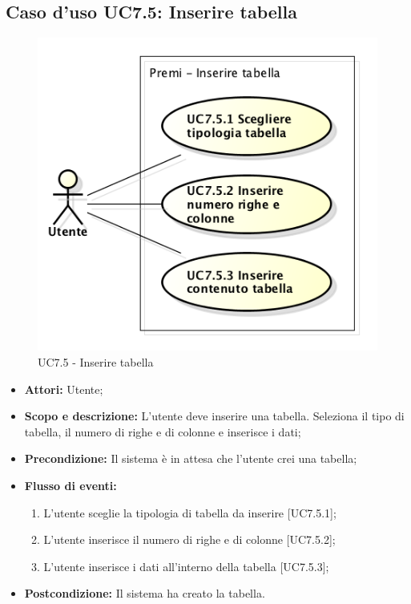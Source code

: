 \subsection{Caso d'uso UC7.5: Inserire tabella}
\begin{figure}[h] 
	\centering 
	\includegraphics[scale=0.45] {img/UC7.5.png} 
	\caption{UC7.5 - Inserire tabella} 
\end{figure}

\begin{itemize}
	\item \textbf{Attori:} Utente;
	\item \textbf{Scopo e descrizione:} L'utente deve inserire una tabella. Seleziona il tipo di tabella, il numero di righe e di colonne e inserisce i dati;
	\item \textbf{Precondizione:} Il sistema è in attesa che l'utente crei una tabella;
	\item \textbf{Flusso di eventi:}
	\begin{enumerate}
		\item L'utente sceglie la tipologia di tabella da inserire [UC7.5.1];
		\item L'utente inserisce il numero di righe e di colonne [UC7.5.2];
		\item L'utente inserisce i dati all'interno della tabella [UC7.5.3];
	\end{enumerate}
	\item \textbf{Postcondizione:} Il sistema ha creato la tabella.
\end{itemize}

